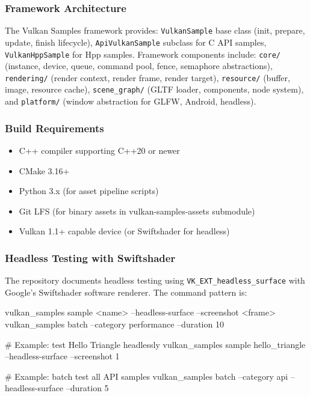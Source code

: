 \documentclass[11pt,letterpaper]{article}
\begin{document}
\subsubsection{Framework Architecture}

The Vulkan Samples framework provides: \texttt{VulkanSample} base class (init, prepare, update, finish lifecycle), \texttt{ApiVulkanSample} subclass for C API samples, \texttt{VulkanHppSample} for Hpp samples. Framework components include: \texttt{core/} (instance, device, queue, command pool, fence, semaphore abstractions), \texttt{rendering/} (render context, render frame, render target), \texttt{resource/} (buffer, image, resource cache), \texttt{scene\_graph/} (GLTF loader, components, node system), and \texttt{platform/} (window abstraction for GLFW, Android, headless).

\subsubsection{Build Requirements}

\begin{itemize}[noitemsep]
  \item C++ compiler supporting C++20 or newer
  \item CMake 3.16+
  \item Python 3.x (for asset pipeline scripts)
  \item Git LFS (for binary assets in vulkan-samples-assets submodule)
  \item Vulkan 1.1+ capable device (or Swiftshader for headless)
\end{itemize}

\subsubsection{Headless Testing with Swiftshader}

The repository documents headless testing using \texttt{VK\_EXT\_headless\_surface} with Google's Swiftshader software renderer. The command pattern is:

\begin{asciibox}
vulkan_samples sample <name> --headless-surface --screenshot <frame>
vulkan_samples batch --category performance --duration 10

# Example: test Hello Triangle headlessly
vulkan_samples sample hello_triangle --headless-surface --screenshot 1

# Example: batch test all API samples
vulkan_samples batch --category api --headless-surface --duration 5
\end{asciibox}
\end{document}
